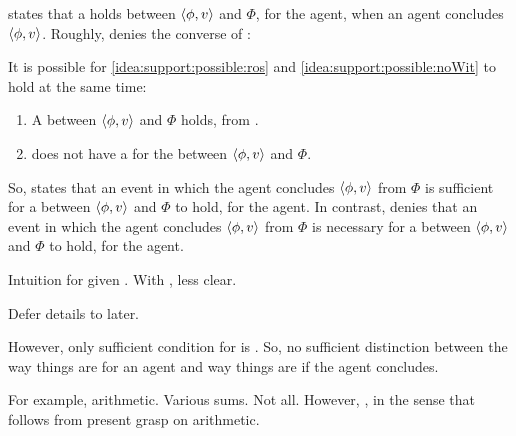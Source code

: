 \begin{note}
  \supportI{} states that a \ros{} holds between \(\langle \phi, v \rangle\) and \(\Phi\), for the agent, when an agent concludes \(\langle \phi, v \rangle\).
  Roughly, \supportII{} denies the converse of \supportI{}:

  \begin{idea}[\supportII{}]%
    \label{idea:support:possible}%
    It is possible for \ref{idea:support:possible:ros} and \ref{idea:support:possible:noWit} to hold at the same time:

    \begin{enumerate}[label=\alph*., ref=(\alph*)]
    \item
      \label{idea:support:possible:ros}
      A \ros{} between \(\langle \phi, v \rangle\) and \(\Phi\) holds, from .
    \item
      \label{idea:support:possible:noWit}
      \vAgent{} does not have a \wit{} for the \ros{} between \(\langle \phi, v \rangle\) and \(\Phi\).
      \end{enumerate}
    \vspace{-\baselineskip}
  \end{idea}

  \noindent%
  So, \supportI{} states that an event in which the agent concludes \(\langle \phi, v \rangle\) from \(\Phi\) is sufficient for a \ros{} between \(\langle \phi, v \rangle\) and \(\Phi\) to hold, for the agent.
  In contrast, \supportII{} denies that an event in which the agent concludes \(\langle \phi, v \rangle\) from \(\Phi\) is necessary for a \ros{} between \(\langle \phi, v \rangle\) and \(\Phi\) to hold, for the agent.
\end{note}

\begin{note}
  \color{red}
  Intuition for \ros{} given \supportI{}.
  With \supportII{}, less clear.

  Defer details to later.

  However, only sufficient condition for \ros{} is \supportI{}.
  So, no sufficient distinction between the way things are for an agent and way things are if the agent concludes.

  For example, arithmetic.
  Various sums.
  Not all.
  However, \ros{}, in the sense that follows from present grasp on arithmetic.
\end{note}

